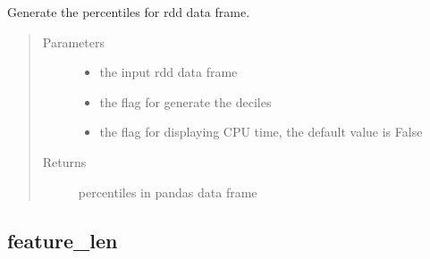 \documentclass[letterpaper,12pt,english]{sphinxmanual}
\begin{document}
\begin{fulllineitems}
Generate the percentiles for rdd data frame.
\begin{quote}\begin{description}
\item[{Parameters}] \leavevmode\begin{itemize}
\item {} 
 \textendash{} the input rdd data frame

\item {} 
 \textendash{} the flag for generate the deciles

\item {} 
 \textendash{} the flag for displaying CPU time, the default value is False

\end{itemize}

\item[{Returns}] \leavevmode
percentiles in pandas data frame

\end{description}\end{quote}

\end{fulllineitems}



\subsection{feature\_len}
\label{\detokenize{basics:feature-len}}
\end{document}

